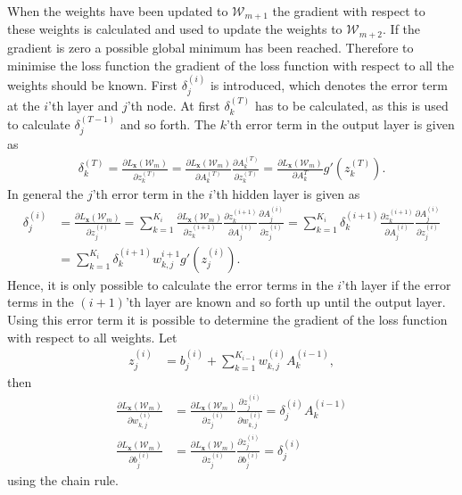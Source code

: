 When the weights have been updated to $\mathcal{W}_{m+1}$ the gradient with respect to these weights is calculated and used to update the weights to $\mathcal{W}_{m+2}$. If the gradient is zero a possible global minimum has been reached. Therefore to minimise the loss function the gradient of the loss function with respect to all the weights should be known. First $\delta^{(i)}_{j}$ is introduced, which denotes the error term at the $i$'th layer and $j$'th node. At first $\delta^{(T)}_k$ has to be calculated, as this is used to calculate $\delta^{(T-1)}_j$ and so forth. The $k$'th error term in the output layer is given as
\begin{align*}
    \delta^{(T)}_{k} =  \frac{\partial L_{\bm{x}}(\mathcal{W}_m)}{\partial z^{(T)}_{k}} = \frac{\partial L_{\bm{x}}(\mathcal{W}_m)}{\partial A_k^{(T)}}\frac{\partial A_k^{(T)}}{\partial z^{(T)}_{k}} = \frac{\partial L_{\bm{x}}(\mathcal{W}_m)}{\partial A_k^{T}} g'(z^{(T)}_{k}).
\end{align*}
In general the $j$'th error term in the $i$'th hidden layer is given as
\begin{align*}
    \delta^{(i)}_{j} &= \frac{\partial L_{\bm{x}}(\mathcal{W}_m)}{\partial z^{(i)}_{j}} = \sum_{k = 1}^{K_{i}} \frac{\partial L_{\bm{x}}(\mathcal{W}_m)}{\partial z^{(i+1)}_{k}} \frac{\partial z^{(i+1)}_{k}}{\partial A^{(i)}_{j}}\frac{\partial A^{(i)}_{j}}{\partial z^{(i)}_{j}} =\sum_{k = 1}^{K_{i}} \delta^{(i+1)}_{k} \frac{\partial z^{(i+1)}_{k}}{\partial A^{(i)}_{j}}\frac{\partial A^{(i)}_{j}}{\partial z^{(i)}_{j}}\\
    &= \sum_{k = 1}^{K_{i}} \delta^{(i+1)}_{k} w_{k,j}^{i+1}g'\left(z_{j}^{(i)}\right).
\end{align*}
Hence, it is only possible to calculate the error terms in the $i$'th layer if the error terms in the $(i+1)$'th layer are known and so forth up until the output layer. Using this error term it is possible to determine the gradient of the loss function with respect to all weights. Let
\begin{align*}
    z^{(i)}_{j} &= b_{j}^{(i)} + \sum_{k=1}^{K_{i-1}} w_{k,j}^{(i)}A_k^{(i-1)},
\end{align*}
then 
\begin{align*}
    \frac{\partial L_{\bm{x}}(\mathcal{W}_m)}{\partial w_{k,j}^{(i)}} &= \frac{\partial L_{\bm{x}}(\mathcal{W}_m)}{\partial z^{(i)}_{j}}\frac{\partial z^{(i)}_{j}}{\partial w_{k,j}^{(i)}} = \delta^{(i)}_{j} A_k^{(i-1)}\\
    \frac{\partial L_{\bm{x}}(\mathcal{W}_m)}{\partial b_{j}^{(i)}} &= \frac{\partial L_{\bm{x}}(\mathcal{W}_m)}{\partial z^{(i)}_{j}}\frac{\partial z^{(i)}_{j}}{\partial b_{j}^{(i)}} = \delta^{(i)}_{j}
\end{align*}
using the chain rule.

